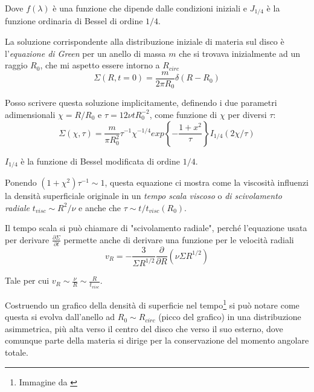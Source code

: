 \documentclass[a4paperbi]{article}
\begin{document}
	Dove $f(\lambda)$ è una funzione che dipende dalle condizioni iniziali e $J_{1/4}$ è la funzione ordinaria di Bessel di ordine $1/4$.
	
	La soluzione corrispondente alla distribuzione iniziale di materia sul disco è l'\textit{equazione di Green} per un anello di massa $m$ che si trovava inizialmente ad un raggio $R_0$, che mi aspetto essere intorno a $R_{circ}$
	\begin{equation}
		\Sigma(R,t=0)=\frac{m}{2\pi R_0}\delta(R-R_0)
	\end{equation}
	
	Posso scrivere questa soluzione implicitamente, definendo i due parametri adimensionali $\chi=R/R_0$ e $\tau=12\nu tR_0^{-2}$, come funzione di $\chi$ per diversi $\tau$:
	\begin{equation}
	\Sigma(\chi,\tau)=\frac{m}{\pi R_0^2}\tau^{-1}\chi^{-1/4}exp\left\{-\frac{1+x^2}{\tau}\right\}I_{1/4}(2\chi/\tau)
	\end{equation}
	
	$I_{1/4}$ è la funzione di Bessel modificata di ordine $1/4$.
	
	Ponendo $(1+\chi^2)\tau^{-1}\sim 1$, questa equazione ci mostra come la viscosità influenzi la densità superficiale originale in un \textit{tempo scala viscoso} o \textit{di scivolamento radiale} $t_{visc}\sim R^2/\nu$ e anche che $\tau\sim t/t_{visc}(R_0)$.
	
	Il tempo scala si può chiamare di "scivolamento radiale", perché l'equazione usata per derivare $\frac{\partial\Sigma}{\partial t}$ permette anche di derivare una funzione per le velocità radiali
	\begin{equation}
		v_R=-\frac{3}{\Sigma R^{1/2}}\frac{\partial}{\partial R}(\nu\Sigma R^{1/2})
	\end{equation}
	
	Tale per cui $v_R\sim\frac{\nu}{R}\sim\frac{R}{t_{visc}}$.
	
	Costruendo un grafico della densità di superficie nel tempo\footnote{Immagine da \cite{Pringle1981}} si può notare come questa si evolva dall'anello ad $R_0\sim R_{circ}$ (picco del grafico) in una distribuzione asimmetrica, più alta verso il centro del disco che verso il suo esterno, dove comunque parte della materia si dirige per la conservazione del momento angolare totale.
	
\end{document}
